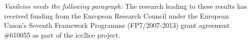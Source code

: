 \documentclass[draft, jgrga]{AGUTeX}
\begin{document}
\begin{article}
%
%
%


\begin{acknowledgments}
\textit{Vasileios needs the following paragraph:}
The research leading to these results has received funding from the European Research Council under the
European Union's Seventh Framework Programme (FP7/2007-2013) grant agreement \#610055 as part
of the ice2ice project.
\end{acknowledgments}








\end{article}
\end{document}
